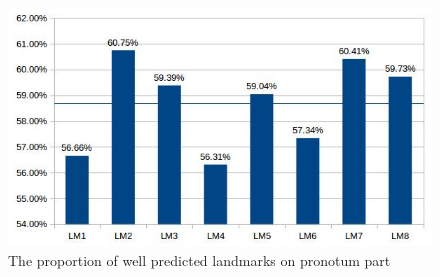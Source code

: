 \documentclass[12pt,a4paper]{article}
\begin{document}
\begin{figure}[h!]
	\centering
	\includegraphics[scale=0.5]{images/pronotum}
	\caption{The proportion of well predicted landmarks on pronotum part}
	\label{pronofig}
\end{figure}~\\[3cm]
\end{document}
